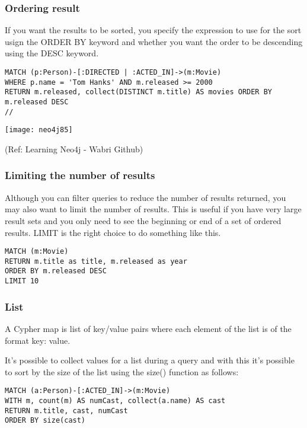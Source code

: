 \begin{frame}[fragile]\frametitle{Ordering result}

If you want the results to be sorted, you specify the expression to use for the sort usign the ORDER BY keyword and whether you want the order to be descending using the DESC keyword.


\begin{lstlisting}
MATCH (p:Person)-[:DIRECTED | :ACTED_IN]->(m:Movie)
WHERE p.name = 'Tom Hanks' AND m.released >= 2000
RETURN m.released, collect(DISTINCT m.title) AS movies ORDER BY m.released DESC
//
\end{lstlisting}

\begin{center}
\texttt{[image: neo4j85]}
\end{center}	  


{\tiny (Ref: Learning Neo4j - Wabri Github)}
\end{frame}

\begin{frame}[fragile]\frametitle{Limiting the number of results}

Although you can filter queries to reduce the number of results returned, you may also want to limit the number of results. This is useful if you have very large result sets and you only need to see the beginning or end of a set of ordered results. LIMIT is the right choice to do something like this.

\begin{lstlisting}
MATCH (m:Movie)
RETURN m.title as title, m.released as year
ORDER BY m.released DESC
LIMIT 10
\end{lstlisting}


\end{frame}


\begin{frame}[fragile]\frametitle{List}

A Cypher map is list of key/value pairs where each element of the list is of the format key: value.

It's possible to collect values for a list during a query and with this it's possible to sort by the size of the list using the size() function as follows:

\begin{lstlisting}
MATCH (a:Person)-[:ACTED_IN]->(m:Movie)
WITH m, count(m) AS numCast, collect(a.name) AS cast
RETURN m.title, cast, numCast
ORDER BY size(cast)
\end{lstlisting}


\end{frame}



